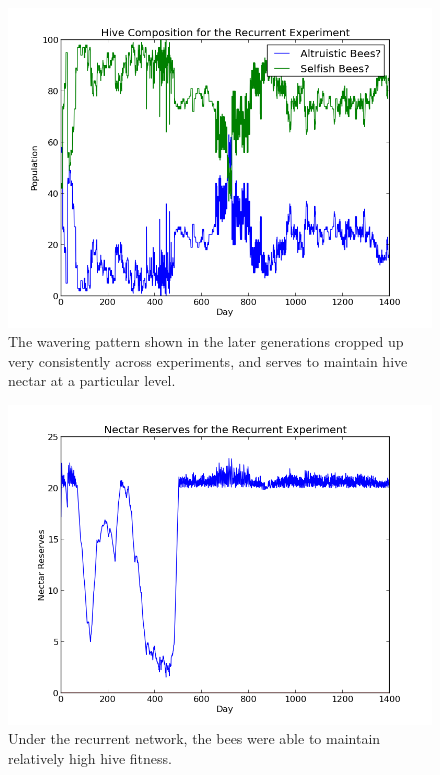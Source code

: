\documentclass[11pt]{article}
\begin{document}
			\begin{figure}[tbph!]
				\begin{center}
					\includegraphics[scale=.5]{results/recurrent_comp.png}
				\end{center}
				\caption{The wavering pattern shown in the later generations cropped up very consistently across experiments, and serves to maintain hive nectar at a particular level.}
				\label{fig:recurrent_composition}
			\end{figure}

			\begin{figure}[tbph!]
				\begin{center}
					\includegraphics[scale=.5]{results/recurrent_res.png}
				\end{center}
				\caption{Under the recurrent network, the bees were able to maintain relatively high hive fitness.}
				\label{fig:recurrent_reserves}
			\end{figure}
\end{document}
